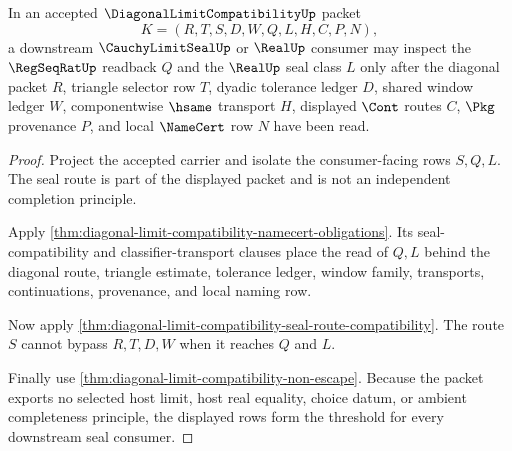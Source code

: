 \begin{theorem}
\label{thm:diagonal-limit-compatibility-seal-consumer-threshold}
In an accepted $\DiagonalLimitCompatibilityUp$ packet
$$
K=(R,T,S,D,W,Q,L,H,C,P,N),
$$
a downstream $\CauchyLimitSealUp$ or $\RealUp$ consumer may inspect the $\RegSeqRatUp$ readback $Q$ and the $\RealUp$ seal class $L$ only after the diagonal packet $R$, triangle selector row $T$, dyadic tolerance ledger $D$, shared window ledger $W$, componentwise $\hsame$ transport $H$, displayed $\Cont$ routes $C$, $\Pkg$ provenance $P$, and local $\NameCert$ row $N$ have been read.
\end{theorem}
\begin{proof}
Project the accepted carrier and isolate the consumer-facing rows $S,Q,L$. The seal route is part of the displayed packet and is not an independent completion principle.

Apply \autoref{thm:diagonal-limit-compatibility-namecert-obligations}. Its seal-compatibility and classifier-transport clauses place the read of $Q,L$ behind the diagonal route, triangle estimate, tolerance ledger, window family, transports, continuations, provenance, and local naming row.

Now apply \autoref{thm:diagonal-limit-compatibility-seal-route-compatibility}. The route $S$ cannot bypass $R,T,D,W$ when it reaches $Q$ and $L$.

Finally use \autoref{thm:diagonal-limit-compatibility-non-escape}. Because the packet exports no selected host limit, host real equality, choice datum, or ambient completeness principle, the displayed rows form the threshold for every downstream seal consumer.
\end{proof}

